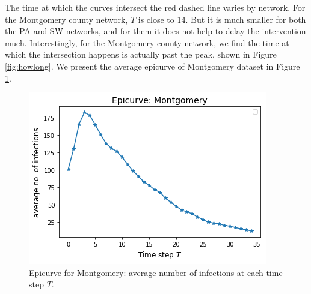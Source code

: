 The time at which the curves intersect the red dashed line varies by network. For the Montgomery county network, $T$ is close to 14. But it is much smaller for both the PA and SW networks, and for them it does not help to delay the intervention much. Interestingly, for the Montgomery county network, we find the time at which the intersection happens is actually past the peak, shown in Figure \ref{fig:howlong}. We present the average epicurve of Montgomery dataset in Figure \ref{fig:epicurve}.




\begin{figure}[!h]
    \centering
    \includegraphics[scale = 0.5]{figures/epicurve.png}
    \caption{Epicurve for Montgomery: average number of infections at each time step $T$.}
    \label{fig:epicurve}
\end{figure}

